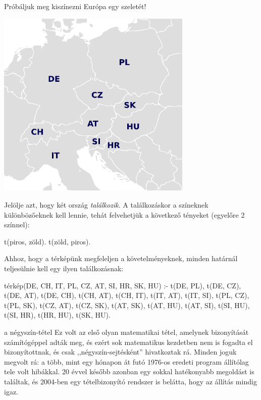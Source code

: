 Próbáljuk meg kiszínezni Európa egy szeletét!

\begin{center}
  \includegraphics[width=0.7\textwidth]{images/europe.pdf}
\end{center}

Jelölje  azt, hogy két ország
\emph{találkozik}. A találkozáskor a színeknek
különbözőeknek kell lennie, tehát felvehetjük a
következő tényeket (egyelőre 2 színnel):
\begin{program}
t(piros, zöld). t(zöld, piros).
\end{program}
Ahhoz, hogy a térképünk megfeleljen a
követelményeknek, minden határnál teljesülnie kell
egy ilyen találkozásnak:
\begin{program}
térkép(DE, CH, IT, PL, CZ, AT, SI, HR, SK, HU) :-
    t(DE, PL), t(DE, CZ), t(DE, AT), t(DE, CH),
    t(CH, AT), t(CH, IT),
    t(IT, AT), t(IT, SI),
    t(PL, CZ), t(PL, SK),
    t(CZ, AT), t(CZ, SK),
    t(AT, SK), t(AT, HU), t(AT, SI),
    t(SI, HU), t(SI, HR),
    t(HR, HU),
    t(SK, HU).
\end{program}

\begin{infobox}{}{a négyszín-tétel}
Ez volt az első olyan matematikai tétel, amelynek
bizonyítását számítógéppel adták meg, és ezért sok
matematikus kezdetben nem is fogadta el
bizonyítottnak, és csak ,,négyszín-sejtésként''
hivatkoztak rá. Minden joguk megvolt rá: a több,
mint egy hónapon át futó 1976-os eredeti program
állítólag tele volt hibákkal. 20 évvel később
azonban egy sokkal hatékonyabb megoldást is
találtak, és 2004-ben egy tételbizonyító rendszer is
belátta, hogy az állítás mindig igaz.
\end{infobox}

